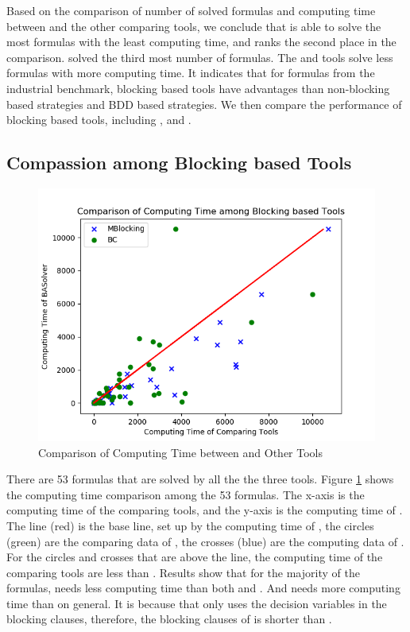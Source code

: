 Based on the comparison of number of solved formulas and computing time between \tool and the other comparing tools, we conclude that \tool is able to solve the most formulas with the least computing time, and \ctool ranks the second place in the comparison. 
\bc solved the third most number of formulas.
The \nbc and \bdd tools solve less formulas with more computing time. 
It indicates that for formulas from the industrial benchmark, blocking based tools have advantages than non-blocking based strategies and BDD based strategies.
We then compare the performance of blocking based tools, including \tool, \ctool and \bc.

\subsection{Compassion among Blocking based Tools}

\begin{figure}
    \centering
    \includegraphics[scale=0.5]{allsat-time.png}
    \caption{Comparison of Computing Time between \tool and Other Tools}
    \label{fig:allsat-time}
\end{figure}

There are 53 formulas that are solved by all the the three tools. Figure \ref{fig:allsat-time} shows the computing time comparison among the 53 formulas. The x-axis is the computing time of the comparing tools, and the y-axis is the computing time of \tool. The line (red) is the base line, set up by the computing time of \tool, the circles (green) are the comparing data of \bc, the crosses (blue) are the computing data of \ctool. For the circles and crosses that are above the line, the computing time of the comparing tools are less than \tool. Results show that for the majority of the formulas, \tool needs less computing time than both \ctool and \bc. And \ctool needs more computing time than \bc on general. It is because that \bc only uses the decision variables in the blocking clauses, therefore, the blocking clauses of \bc is shorter than \ctool. 

